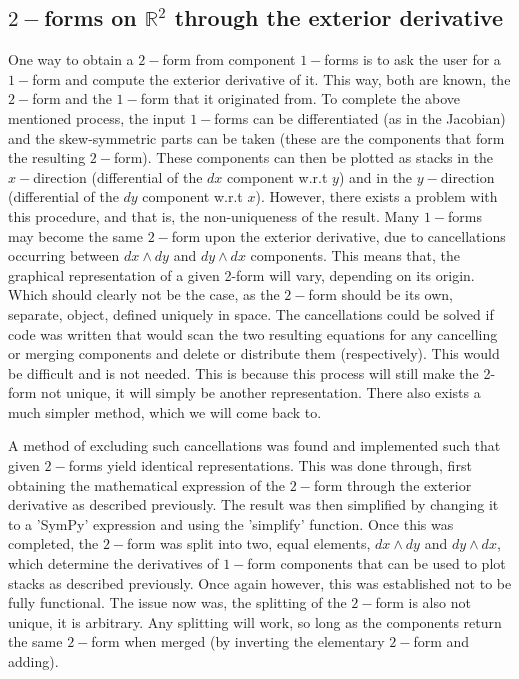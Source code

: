 \documentclass[12pt]{report}
\begin{document}
\subsection{$2-$forms on $\mathbb{R}^2$ through the exterior derivative}
One way to obtain a $2-$form from component $1-$forms is to ask the user for a $1-$form and compute the exterior derivative of it. This way, both are known, the $2-$form and the $1-$form that it originated from. To complete the above mentioned process, the input $1-$forms can be differentiated (as in the Jacobian) and the skew-symmetric parts can be taken (these are the components that form the resulting $2-$form). These components can then be plotted as stacks in the $x-$direction (differential of the $dx$ component w.r.t $y$) and in the $y-$direction (differential of the $dy$ component w.r.t $x$). However, there exists a problem with this procedure, and that is, the non-uniqueness of the result. Many $1-$forms may become the same $2-$form upon the exterior derivative, due to cancellations occurring between $dx \wedge dy$ and $dy\wedge dx$ components.  This means that, the graphical representation of a given 2-form will vary, depending on its origin. Which should clearly not be the case, as the $2-$form should be its own, separate, object, defined uniquely in space.
The cancellations could be solved if code was written that would scan the two resulting equations for any cancelling or merging components and delete or distribute them (respectively). This would be difficult and is not needed. This is because this process will still make the 2-form not unique, it will simply be another representation. There also exists a much simpler method, which we will come back to.

A method of excluding such cancellations was found and implemented such that given $2-$forms yield identical representations. This was done through, first obtaining the mathematical expression of the $2-$form through the exterior derivative as described previously. The result was then simplified by changing it to a 'SymPy' expression and using the 'simplify' function. Once this was completed, the $2-$form was split into two, equal elements, $dx \wedge dy$ and $dy\wedge dx$, which determine the derivatives of $1-$form components that can be used to plot stacks as described previously.
Once again however, this was established not to be fully functional. The issue now was, the splitting of the $2-$form is also not unique, it is arbitrary. Any splitting will work, so long as the components return the same $2-$form when merged (by inverting the elementary $2-$form and adding).
\end{document}
